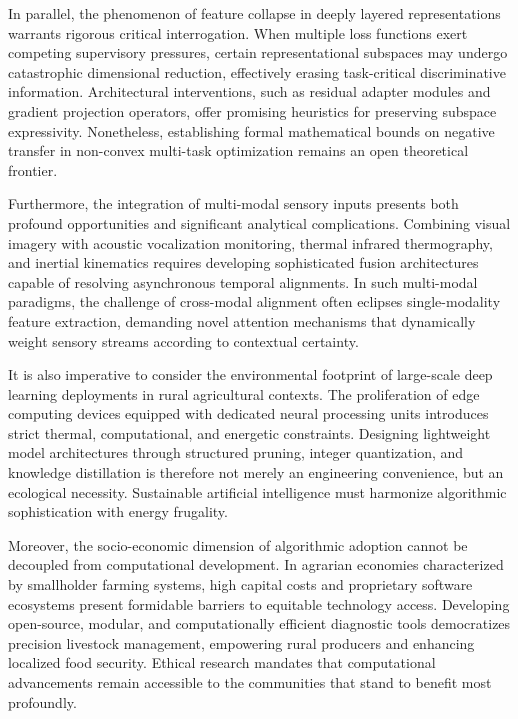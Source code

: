 \documentclass[Times,12pt,oneside,openany,print,index]{report}
\begin{document}
In parallel, the phenomenon of feature collapse in deeply layered representations warrants rigorous critical interrogation. When multiple loss functions exert competing supervisory pressures, certain representational subspaces may undergo catastrophic dimensional reduction, effectively erasing task-critical discriminative information. Architectural interventions, such as residual adapter modules and gradient projection operators, offer promising heuristics for preserving subspace expressivity. Nonetheless, establishing formal mathematical bounds on negative transfer in non-convex multi-task optimization remains an open theoretical frontier.

Furthermore, the integration of multi-modal sensory inputs presents both profound opportunities and significant analytical complications. Combining visual imagery with acoustic vocalization monitoring, thermal infrared thermography, and inertial kinematics requires developing sophisticated fusion architectures capable of resolving asynchronous temporal alignments. In such multi-modal paradigms, the challenge of cross-modal alignment often eclipses single-modality feature extraction, demanding novel attention mechanisms that dynamically weight sensory streams according to contextual certainty.

It is also imperative to consider the environmental footprint of large-scale deep learning deployments in rural agricultural contexts. The proliferation of edge computing devices equipped with dedicated neural processing units introduces strict thermal, computational, and energetic constraints. Designing lightweight model architectures through structured pruning, integer quantization, and knowledge distillation is therefore not merely an engineering convenience, but an ecological necessity. Sustainable artificial intelligence must harmonize algorithmic sophistication with energy frugality.

Moreover, the socio-economic dimension of algorithmic adoption cannot be decoupled from computational development. In agrarian economies characterized by smallholder farming systems, high capital costs and proprietary software ecosystems present formidable barriers to equitable technology access. Developing open-source, modular, and computationally efficient diagnostic tools democratizes precision livestock management, empowering rural producers and enhancing localized food security. Ethical research mandates that computational advancements remain accessible to the communities that stand to benefit most profoundly.
\end{document}
